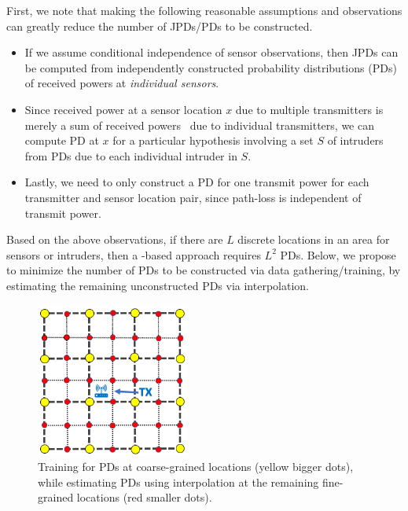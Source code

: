   First, we note that making the
following reasonable assumptions and observations can greatly reduce
the number of JPDs/PDs to be constructed.
\begin{itemize}
  \item
If we assume conditional independence of sensor observations, then
JPDs can be computed from independently constructed probability
distributions (PDs) of received powers at {\em individual sensors}.

\item
  Since received power at a sensor location $x$ due to multiple
  transmitters is merely a sum of received powers~\cite{rappaport-2001,mobicom17-splot} due to individual
  transmitters, we can compute PD at $x$ for a particular hypothesis
  involving a set $S$ of intruders from PDs due to each individual
  intruder in $S$.

\item
  Lastly, we need to only construct a PD for one transmit power for
  each transmitter and sensor location pair, since path-loss is
  independent of transmit power.
\end{itemize}
Based on the above observations, if there are $L$ discrete locations
in an area for sensors or intruders, then a \mll-based approach
requires $L^2$ PDs. Below, we propose to minimize the number of PDs to
be constructed via data gathering/training, by estimating the
remaining unconstructed PDs via interpolation.


\begin{figure}
  \center
  \includegraphics[width=0.45\textwidth]{chapters/ipsn/figures/multi-granular.png}
  \caption{Training for PDs at coarse-grained locations (yellow bigger
          dots), while estimating PDs using interpolation at the remaining
          fine-grained locations (red smaller dots).}
  \label{fig:path-loss}
\end{figure}

